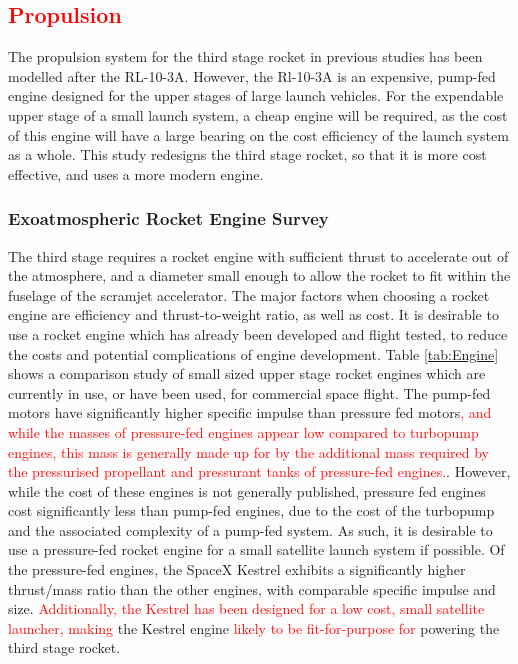 		\textcolor{red}{
		\subsection{Propulsion}
	}
	
	The propulsion system for the third stage rocket in previous studies has been modelled after the RL-10-3A\cite{Preller2018a}. However, the Rl-10-3A is an expensive, pump-fed engine designed for the upper stages of large launch vehicles. For the expendable upper stage of a small launch system, a cheap engine will be required, as the cost of this engine will have a large bearing on the cost efficiency of the launch system as a whole. This study redesigns the third stage rocket, so that it is more cost effective, and uses a more modern engine.  
	
	
		\subsubsection{Exoatmospheric Rocket Engine Survey}%
		The third stage requires a rocket engine with sufficient thrust to accelerate out of the atmosphere, and a diameter small enough to allow the rocket to fit within the fuselage of the scramjet accelerator. The major factors when choosing a rocket engine are efficiency and thrust-to-weight ratio, as well as cost. It is desirable to use a rocket engine which has already been developed and flight tested, to reduce the costs and potential complications of engine development. Table \ref{tab:Engine} shows a comparison study of small sized upper stage rocket engines which are currently in use, or have been used, for commercial space flight. The pump-fed motors have significantly higher specific impulse than pressure fed motors\textcolor{red}{, and while the masses of pressure-fed engines appear low compared to turbopump engines, this mass is generally made up for by the additional mass required by the pressurised propellant and pressurant tanks of pressure-fed engines.}. However, while the cost of these engines is not generally published, pressure fed engines cost significantly less than pump-fed engines, due to the cost of the turbopump and the associated complexity of a pump-fed system.  As such, it is desirable to use a pressure-fed rocket engine for a small satellite launch system if possible. Of the pressure-fed engines, the SpaceX Kestrel exhibits a significantly higher thrust/mass ratio than the other engines, with comparable specific impulse and size. \textcolor{red}{Additionally, the Kestrel has been designed for a low cost, small satellite launcher, making} the Kestrel engine \textcolor{red}{likely to be fit-for-purpose for} powering the third stage rocket.  

